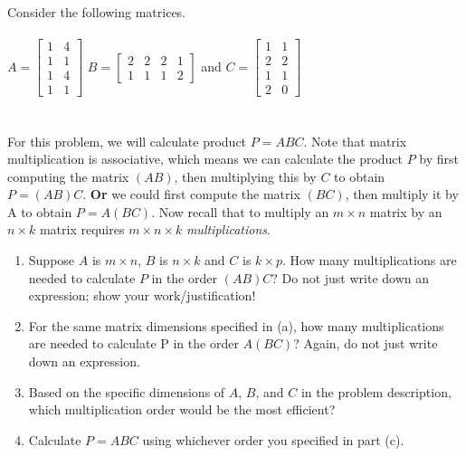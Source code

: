 \documentclass[11pt]{amsart}
\newcommand{\be}{\begin{enumerate}}
\newcommand{\ee}{\end{enumerate}}
\begin{document}
\clearpage
\item  Consider the following matrices. \\\\
	$A=\begin{bmatrix} 1&4\\ 1&1\\ 1&4\\ 1&1 \end{bmatrix}$
	$B=\begin{bmatrix} 2&2&2&1\\ 1&1&1&2\end{bmatrix}$ and 
	$C=\begin{bmatrix} 1&1\\ 2&2\\ 1&1\\ 2&0\end{bmatrix}$\\\\\\
	For this problem, we will calculate product $P=ABC$. Note that matrix multiplication is associative, which means we can calculate the product $P$ by first computing the matrix $(AB)$, then multiplying this by $C$ to obtain $P=(AB)C$. \textbf{Or} we could first compute the matrix $(BC)$, then multiply it by A to obtain $P=A(BC)$. Now recall that to multiply an $m\times n$ matrix by an $n\times k$ matrix requires $m\times n\times k$ \textit{multiplications}.\\
	\be
		\item Suppose $A$ is $m\times n$, $B$ is $n\times k$ and $C$ is $k\times p$. How many multiplications are needed to calculate $P$ in the order $(AB)C$? Do not just write down an expression; show your work/justification!
		\item For the same matrix dimensions specified in (a), how many multiplications are needed to calculate P in the order $A(BC)$? Again, do not just write down an expression.
		\item Based on the specific dimensions of $A$, $B$, and $C$ in the problem description, which multiplication order would be the most efficient?
		\item Calculate $P=ABC$ using whichever order you specified in part (c).
	\ee
\end{document}
